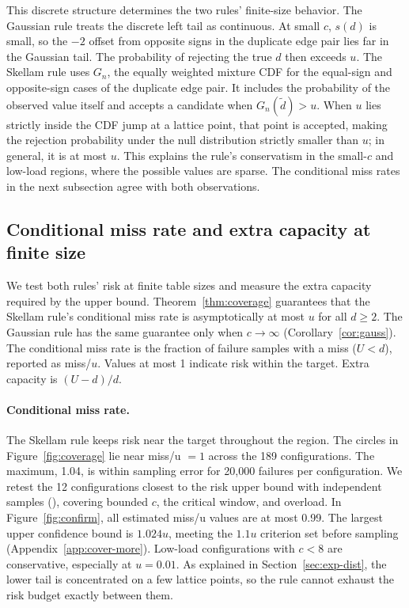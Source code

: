 This discrete structure determines the two rules' finite-size behavior. The Gaussian rule treats the discrete left tail as continuous. At small $c$, $s(d)$ is small, so the $-2$ offset from opposite signs in the duplicate edge pair lies far in the Gaussian tail. The probability of rejecting the true $d$ then exceeds $u$. The Skellam rule uses $G_n$, the equally weighted mixture CDF for the equal-sign and opposite-sign cases of the duplicate edge pair. It includes the probability of the observed value itself and accepts a candidate when $G_n(\widetilde d)>u$. When $u$ lies strictly inside the CDF jump at a lattice point, that point is accepted, making the rejection probability under the null distribution strictly smaller than $u$; in general, it is at most $u$. This explains the rule's conservatism in the small-$c$ and low-load regions, where the possible values are sparse. The conditional miss rates in the next subsection agree with both observations.

\subsection{Conditional miss rate and extra capacity at finite size}\label{sec:exp-cover}
We test both rules' risk at finite table sizes and measure the extra capacity required by the upper bound. Theorem~\ref{thm:coverage} guarantees that the Skellam rule's conditional miss rate is asymptotically at most $u$ for all $d\ge2$. The Gaussian rule has the same guarantee only when $c\to\infty$ (Corollary~\ref{cor:gauss}). The conditional miss rate is the fraction of failure samples with a miss ($U<d$), reported as miss/$u$. Values at most 1 indicate risk within the target. Extra capacity is $(U-d)/d$.

\paragraph{Conditional miss rate.}
The Skellam rule keeps risk near the target throughout the region. The circles in Figure~\ref{fig:coverage} lie near miss/u $=1$ across the 189 configurations. The maximum, 1.04, is within sampling error for 20,000 failures per configuration. We retest the 12 configurations closest to the risk upper bound with independent samples (), covering bounded $c$, the critical window, and overload. In Figure~\ref{fig:confirm}, all estimated miss/u values are at most 0.99. The largest upper confidence bound is $1.024u$, meeting the $1.1u$ criterion set before sampling (Appendix~\ref{app:cover-more}). Low-load configurations with $c<8$ are conservative, especially at $u=0.01$. As explained in Section~\ref{sec:exp-dist}, the lower tail is concentrated on a few lattice points, so the rule cannot exhaust the risk budget exactly between them.

